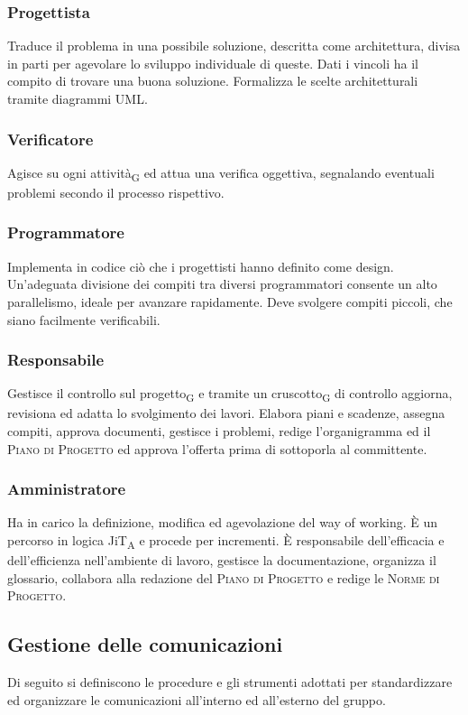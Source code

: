     \subsubsection{Progettista}
    Traduce il problema in una possibile soluzione, descritta come architettura, divisa in parti per agevolare lo sviluppo individuale di queste. Dati i vincoli ha il compito di trovare una buona soluzione. Formalizza le scelte architetturali tramite diagrammi UML.
    \subsubsection{Verificatore}
    Agisce su ogni attività\textsubscript{G} ed attua una verifica oggettiva, segnalando eventuali problemi secondo il processo rispettivo.
    \subsubsection{Programmatore}
    Implementa in codice ciò che i progettisti hanno definito come design. Un'adeguata divisione dei compiti tra diversi programmatori consente un alto parallelismo, ideale per avanzare rapidamente. Deve svolgere compiti piccoli, che siano facilmente verificabili.
    \subsubsection{Responsabile}
    Gestisce il controllo sul progetto\textsubscript{G} e tramite un cruscotto\textsubscript{G} di controllo aggiorna, revisiona ed adatta lo svolgimento dei lavori. Elabora piani e scadenze, assegna compiti, approva documenti, gestisce i problemi, redige l'organigramma ed il \textsc{Piano di Progetto} ed approva l'offerta prima di sottoporla al committente.
    \subsubsection{Amministratore}
    Ha in carico la definizione, modifica ed agevolazione del way of working. È un percorso in logica JiT\textsubscript{A} e procede per incrementi. È responsabile dell'efficacia e dell'efficienza nell'ambiente di lavoro, gestisce la documentazione, organizza il glossario, collabora alla redazione del \textsc{Piano di Progetto} e redige le \textsc{Norme di Progetto}.

\subsection{Gestione delle comunicazioni}
    Di seguito si definiscono le procedure e gli strumenti adottati per standardizzare ed organizzare le comunicazioni all'interno ed all'esterno del gruppo.
